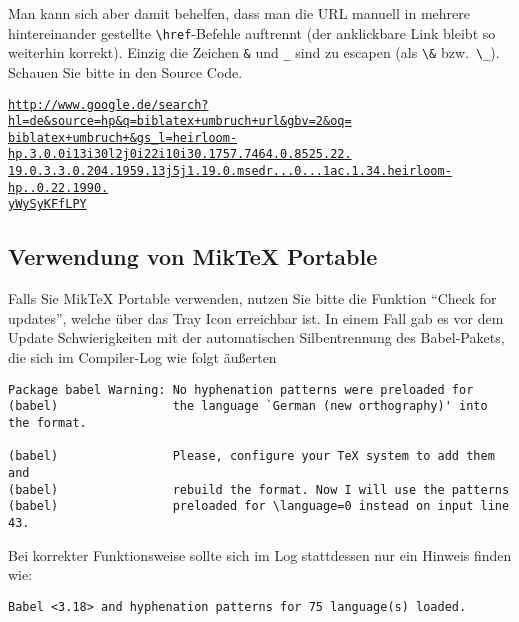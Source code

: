 Man kann sich aber damit behelfen, dass man die URL manuell in mehrere hintereinander gestellte \verb|\href|-Befehle auftrennt (der anklickbare Link bleibt so weiterhin korrekt). Einzig die Zeichen \verb|&| und \verb|_| sind zu escapen (als \verb|\&| bzw.\ \verb|\_|). Schauen Sie bitte in den Source Code.

\newcommand{\mylongurl}[1]{%
\href{http://www.google.de/search?hl=de&source=hp&q=biblatex+umbruch+url&gbv=2&oq=biblatex+umbruch+&gs_l=heirloom-hp.3.0.0i13i30l2j0i22i10i30.1757.7464.0.8525.22.19.0.3.3.0.204.1959.13j5j1.19.0.msedr...0...1ac.1.34.heirloom-hp..0.22.1990.yWySyKFfLPY}{\texttt{#1}}\\}

\mylongurl{http://www.google.de/search?hl=de\&source=hp\&q=biblatex+umbruch+url\&gbv=2\&oq=}
\mylongurl{biblatex+umbruch+\&gs\_l=heirloom-hp.3.0.0i13i30l2j0i22i10i30.1757.7464.0.8525.22.}
\mylongurl{19.0.3.3.0.204.1959.13j5j1.19.0.msedr...0...1ac.1.34.heirloom-hp..0.22.1990.}
\mylongurl{yWySyKFfLPY}

\subsection{Verwendung von MikTeX Portable}
Falls Sie MikTeX Portable verwenden, nutzen Sie bitte die Funktion \enquote{Check for updates}, welche über das Tray Icon erreichbar ist. In einem Fall gab es vor dem Update Schwierigkeiten mit der automatischen Silbentrennung des Babel-Pakets, die sich im Compiler-Log wie folgt äußerten
{\small\begin{verbatim}
Package babel Warning: No hyphenation patterns were preloaded for
(babel)                the language `German (new orthography)' into the format.

(babel)                Please, configure your TeX system to add them and
(babel)                rebuild the format. Now I will use the patterns
(babel)                preloaded for \language=0 instead on input line 43.
\end{verbatim}
}
Bei korrekter Funktionsweise sollte sich im Log stattdessen nur ein Hinweis finden wie:
{\small\begin{verbatim}
Babel <3.18> and hyphenation patterns for 75 language(s) loaded.
\end{verbatim}
}
